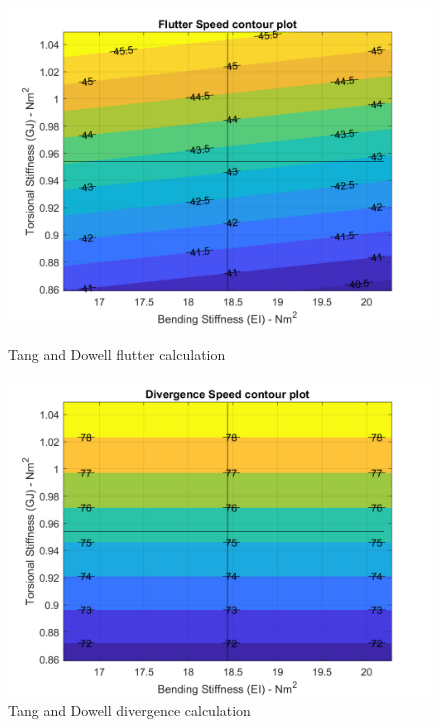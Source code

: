 \documentclass[11pt]{article}
\begin{document}
\begin{figure}[!hbt]
    \begin{minipage}{.5\textwidth}
    \centering
    \includegraphics[width = \textwidth]{figures/Tang_flutter.png}
    \caption{Tang and Dowell flutter calculation}
    \label{fig:TandD-flutter}
    \end{minipage}%
    \begin{minipage}{.5\textwidth}
    \centering
    \includegraphics[width = \textwidth]{figures/Tang_divergence.png}
    \caption{Tang and Dowell divergence calculation}
    \label{fig:TandD-div}
    \end{minipage}
\end{figure}
\end{document}
